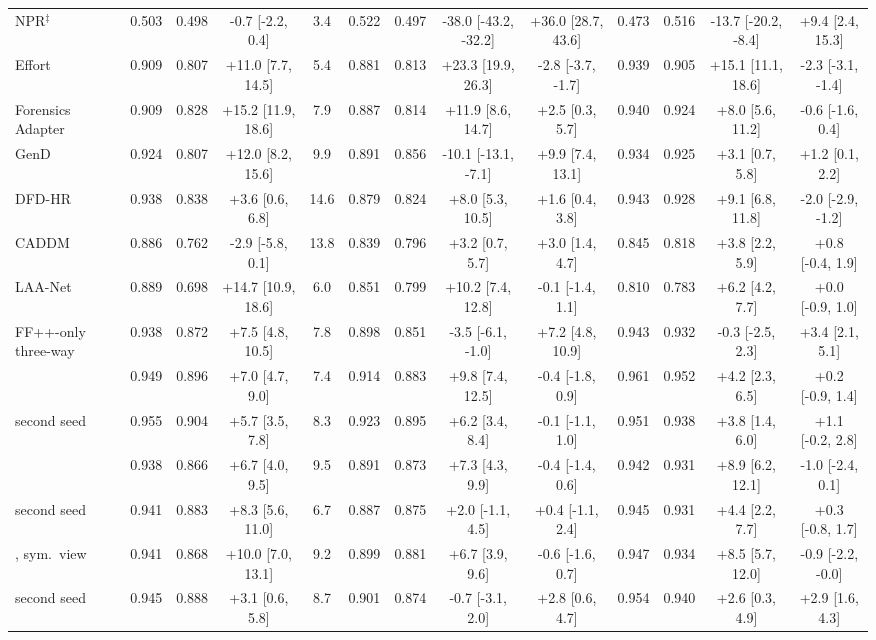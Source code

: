 \begin{tabular}{@{}l cccc cccc cccc@{}}
NPR$^\ddagger$~\cite{npr} & 0.503 & 0.498 & -0.7 [-2.2, 0.4] & 3.4 & 0.522 & 0.497 & -38.0 [-43.2, -32.2] & +36.0 [28.7, 43.6] & 0.473 & 0.516 & -13.7 [-20.2, -8.4] & +9.4 [2.4, 15.3] \\
Effort~\cite{effort} & 0.909 & 0.807 & +11.0 [7.7, 14.5] & 5.4 & 0.881 & 0.813 & +23.3 [19.9, 26.3] & -2.8 [-3.7, -1.7] & 0.939 & 0.905 & +15.1 [11.1, 18.6] & -2.3 [-3.1, -1.4] \\
Forensics Adapter~\cite{forensicsadapter} & 0.909 & 0.828 & +15.2 [11.9, 18.6] & 7.9 & 0.887 & 0.814 & +11.9 [8.6, 14.7] & +2.5 [0.3, 5.7] & 0.940 & 0.924 & +8.0 [5.6, 11.2] & -0.6 [-1.6, 0.4] \\
GenD~\cite{gend2026} & 0.924 & 0.807 & +12.0 [8.2, 15.6] & 9.9 & 0.891 & 0.856 & -10.1 [-13.1, -7.1] & +9.9 [7.4, 13.1] & 0.934 & 0.925 & +3.1 [0.7, 5.8] & +1.2 [0.1, 2.2] \\
DFD-HR~\cite{dfdhr2026} & 0.938 & 0.838 & +3.6 [0.6, 6.8] & 14.6 & 0.879 & 0.824 & +8.0 [5.3, 10.5] & +1.6 [0.4, 3.8] & 0.943 & 0.928 & +9.1 [6.8, 11.8] & -2.0 [-2.9, -1.2] \\
CADDM~\cite{caddm} & 0.886 & 0.762 & -2.9 [-5.8, 0.1] & 13.8 & 0.839 & 0.796 & +3.2 [0.7, 5.7] & +3.0 [1.4, 4.7] & 0.845 & 0.818 & +3.8 [2.2, 5.9] & +0.8 [-0.4, 1.9] \\
LAA-Net~\cite{laanet} & 0.889 & 0.698 & +14.7 [10.9, 18.6] & 6.0 & 0.851 & 0.799 & +10.2 [7.4, 12.8] & -0.1 [-1.4, 1.1] & 0.810 & 0.783 & +6.2 [4.2, 7.7] & +0.0 [-0.9, 1.0] \\
\midrule
FF++-only three-way & 0.938 & 0.872 & +7.5 [4.8, 10.5] & 7.8 & 0.898 & 0.851 & -3.5 [-6.1, -1.0] & +7.2 [4.8, 10.9] & 0.943 & 0.932 & -0.3 [-2.5, 2.3] & +3.4 [2.1, 5.1] \\
\oursB{} & 0.949 & 0.896 & +7.0 [4.7, 9.0] & 7.4 & 0.914 & 0.883 & +9.8 [7.4, 12.5] & -0.4 [-1.8, 0.9] & 0.961 & 0.952 & +4.2 [2.3, 6.5] & +0.2 [-0.9, 1.4] \\
\quad second seed & 0.955 & 0.904 & +5.7 [3.5, 7.8] & 8.3 & 0.923 & 0.895 & +6.2 [3.4, 8.4] & -0.1 [-1.1, 1.0] & 0.951 & 0.938 & +3.8 [1.4, 6.0] & +1.1 [-0.2, 2.8] \\
\oursF{} & 0.938 & 0.866 & +6.7 [4.0, 9.5] & 9.5 & 0.891 & 0.873 & +7.3 [4.3, 9.9] & -0.4 [-1.4, 0.6] & 0.942 & 0.931 & +8.9 [6.2, 12.1] & -1.0 [-2.4, 0.1] \\
\quad second seed & 0.941 & 0.883 & +8.3 [5.6, 11.0] & 6.7 & 0.887 & 0.875 & +2.0 [-1.1, 4.5] & +0.4 [-1.1, 2.4] & 0.945 & 0.931 & +4.4 [2.2, 7.7] & +0.3 [-0.8, 1.7] \\
\oursF{}, sym.\ view & 0.941 & 0.868 & +10.0 [7.0, 13.1] & 9.2 & 0.899 & 0.881 & +6.7 [3.9, 9.6] & -0.6 [-1.6, 0.7] & 0.947 & 0.934 & +8.5 [5.7, 12.0] & -0.9 [-2.2, -0.0] \\
\quad second seed & 0.945 & 0.888 & +3.1 [0.6, 5.8] & 8.7 & 0.901 & 0.874 & -0.7 [-3.1, 2.0] & +2.8 [0.6, 4.7] & 0.954 & 0.940 & +2.6 [0.3, 4.9] & +2.9 [1.6, 4.3] \\
\bottomrule
\end{tabular}

